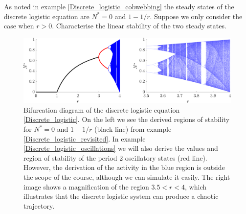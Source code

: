 \begin{example}[frametitle=Discrete logistic equation revisited \label{Discrete_logistic_revisited}]
As noted in example \ref{Discrete_logistic_cobwebbing} the steady states of the discrete logistic equation are $N^*=0$ and $1-1/r$. Suppose we only consider the case when $r>0$. Characterise the linear stability of the two steady states.

\end{example}
\begin{figure}[ph!!!tb]
\centering
\includegraphics[width=\textwidth]{../Pictures/Logistic_bifurcation.png}
\caption{Bifurcation diagram of the discrete logistic equation \eqref{Discrete_logistic}. On the left we see the derived regions of stability for $N^*=0$ and $1-1/r$ (black line) from example \ref{Discrete_logistic_revisited}. In example \ref{Discrete_logistic_oscillations} we will also derive the values and region of stability of the period 2 oscillatory states (red line). However, the derivation of the activity in the blue region is outside the scope of the course, although we can simulate it easily. The right image shows a magnification of the region $3.5<r<4$, which illustrates that the discrete logistic system can produce a chaotic trajectory.\label{Logistic_bifurcation_diagram}}
\end{figure}

